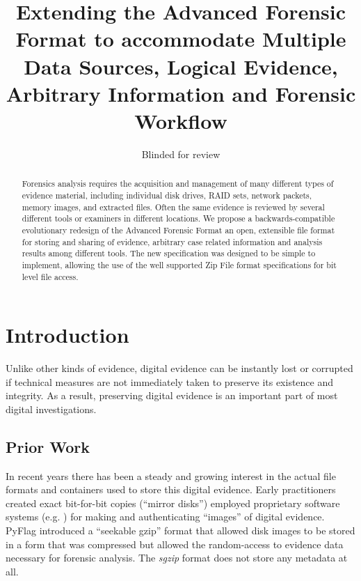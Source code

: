 \documentclass[10pt, conference]{IEEEtran}
\begin{document}
\title{Extending the Advanced Forensic Format to accommodate Multiple
  Data Sources, Logical Evidence, Arbitrary Information and Forensic Workflow}
\author{Blinded for review}
\maketitle

\begin{abstract}
Forensics analysis requires the acquisition and management of many
different types of evidence material, including individual disk
drives, RAID sets, network packets, memory images, and extracted
files. Often the same evidence is reviewed by several different tools
or examiners in different locations. We propose a backwards-compatible
evolutionary redesign of the Advanced Forensic Format an open,
extensible file format for storing and sharing of evidence, arbitrary
case related information and analysis results among different
tools. The new specification was designed to be simple to implement,
allowing the use of the well supported Zip File format specifications
for bit level file access.
\end{abstract}

\section{Introduction}
Unlike other kinds of evidence, digital evidence can be instantly lost
or corrupted if technical measures are not immediately taken to
preserve its existence and integrity. As a result, preserving digital
evidence is an important part of most digital
investigations\cite{carrier:event-based}.

\subsection{Prior Work}
In recent years there has been a steady and growing interest in the
actual file formats and containers used to store this digital
evidence. Early practitioners created exact bit-for-bit copies
(``mirror disks'') employed proprietary software systems
(e.g. \cite{safeback,ilook,encase}) for making and authenticating
``images'' of digital evidence. PyFlag\cite{pyflag} introduced a
``seekable gzip'' format that allowed disk images to be stored in a
form that was compressed but allowed the random-access to evidence
data necessary for forensic analysis. The \emph{sgzip} format does not
store any metadata at all.
\end{document}
